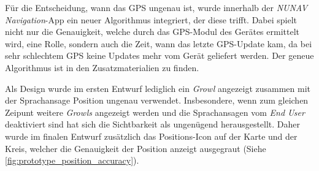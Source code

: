 Für die Entscheidung, wann das GPS ungenau ist, wurde innerhalb der \textit{NUNAV Navigation}-App ein neuer Algorithmus integriert, der diese trifft. Dabei spielt nicht nur die Genauigkeit, welche durch das GPS-Modul des Gerätes ermittelt wird, eine Rolle, sondern auch die Zeit, wann das letzte GPS-Update kam, da bei sehr schlechtem GPS keine Updates mehr vom Gerät geliefert werden. Der geneue Algorithmus ist in den Zusatzmaterialien zu finden.

Als Design wurde im ersten Entwurf lediglich ein \textit{Growl} angezeigt zusammen mit der Sprachansage \glqq Position ungenau\grqq{} verwendet. Insbesondere, wenn zum gleichen Zeipunt weitere \textit{Growls} angezeigt werden und die Sprachansagen vom \textit{End User} deaktiviert sind hat sich die Sichtbarkeit als ungenügend herausgestellt. Daher wurde im finalen Entwurf zusätzlich das Positions-Icon auf der Karte und der Kreis, welcher die Genauigkeit der Position anzeigt ausgegraut (Siehe \autoref{fig:prototype_position_accuracy}).
